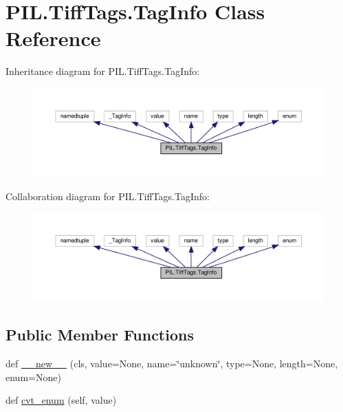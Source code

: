 \hypertarget{classPIL_1_1TiffTags_1_1TagInfo}{}\section{P\+I\+L.\+Tiff\+Tags.\+Tag\+Info Class Reference}
\label{classPIL_1_1TiffTags_1_1TagInfo}


Inheritance diagram for P\+I\+L.\+Tiff\+Tags.\+Tag\+Info\+:
\nopagebreak
\begin{figure}[H]
\begin{center}
\leavevmode
\includegraphics[width=350pt]{classPIL_1_1TiffTags_1_1TagInfo__inherit__graph}
\end{center}
\end{figure}


Collaboration diagram for P\+I\+L.\+Tiff\+Tags.\+Tag\+Info\+:
\nopagebreak
\begin{figure}[H]
\begin{center}
\leavevmode
\includegraphics[width=350pt]{classPIL_1_1TiffTags_1_1TagInfo__coll__graph}
\end{center}
\end{figure}
\subsection*{Public Member Functions}
\begin{DoxyCompactItemize}
\item 
def \hyperlink{classPIL_1_1TiffTags_1_1TagInfo_a2346122385c2988bfe12537a63e75fea}{\+\_\+\+\_\+new\+\_\+\+\_\+} (cls, value=None, name=\char`\"{}unknown\char`\"{}, type=None, length=None, enum=None)
\item 
def \hyperlink{classPIL_1_1TiffTags_1_1TagInfo_a4289a55bab3269f857d11ec4fdaf3268}{cvt\+\_\+enum} (self, value)
\end{DoxyCompactItemize}


